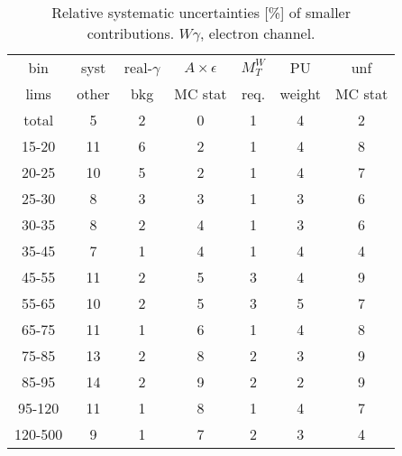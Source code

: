 \begin{table}[h]
  \scriptsize
  \begin{center}
  \caption{Relative systematic uncertainties [\%] of smaller contributions. $W\gamma$, electron channel.}
  \begin{tabular}{|c|c|c|c|c|c|c|}
    bin  & syst & real-$\gamma$ & $A\times\epsilon$ & $M_T^W$ & PU & unf\\
    lims  & other & bkg & MC stat & req. & weight & MC stat\\ \hline
    total  & 5 & 2 & 0 & 1 & 4 & 2 \\ \hline
    15-20 & 11 & 6 & 2 & 1 & 4 & 8 \\ \hline
    20-25 & 10 & 5 & 2 & 1 & 4 & 7 \\ \hline
    25-30 & 8 & 3 & 3 & 1 & 3 & 6 \\ \hline
    30-35 & 8 & 2 & 4 & 1 & 3 & 6 \\ \hline
    35-45 & 7 & 1 & 4 & 1 & 4 & 4 \\ \hline
    45-55 & 11 & 2 & 5 & 3 & 4 & 9 \\ \hline
    55-65 & 10 & 2 & 5 & 3 & 5 & 7 \\ \hline
    65-75 & 11 & 1 & 6 & 1 & 4 & 8 \\ \hline
    75-85 & 13 & 2 & 8 & 2 & 3 & 9 \\ \hline
    85-95 & 14 & 2 & 9 & 2 & 2 & 9 \\ \hline
    95-120 & 11 & 1 & 8 & 1 & 4 & 7 \\ \hline
    120-500 & 9 & 1 & 7 & 2 & 3 & 4 \\ \hline
  \end{tabular}
  \label{tab:systInPercentSmallSysts_ELECTRON_WGamma}
  \end{center}
\end{table}


